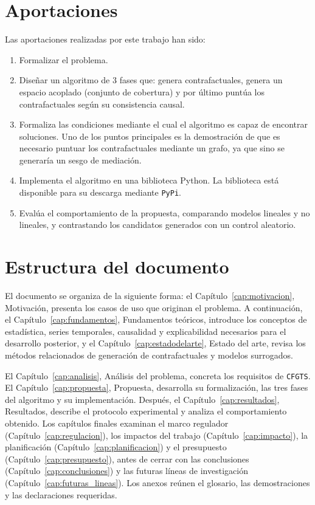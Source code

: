 \documentclass[12pt]{report} %
\begin{document}
\section{Aportaciones}

Las aportaciones realizadas por este trabajo han sido:
\begin{enumerate}
    \item Formalizar el problema.
    \item Diseñar un algoritmo de 3 fases que: genera contrafactuales, genera un espacio acoplado (conjunto de cobertura) y por último puntúa los contrafactuales según su consistencia causal.
    \item Formaliza las condiciones mediante el cual el algoritmo es capaz de encontrar soluciones. Uno de los puntos principales es la demostración de que es necesario puntuar los contrafactuales mediante un grafo, ya que sino se generaría un sesgo de mediación.
    \item Implementa el algoritmo en una biblioteca Python. La biblioteca está disponible para su descarga mediante \texttt{PyPi}.
    \item Evalúa el comportamiento de la propuesta, comparando modelos lineales y no lineales, y contrastando los candidatos generados con un control aleatorio.
\end{enumerate}


\section{Estructura del documento}

El documento se organiza de la siguiente forma: el Capítulo~\ref{cap:motivacion}, Motivación, presenta los casos de uso que originan el problema. A continuación, el Capítulo~\ref{cap:fundamentos}, Fundamentos teóricos, introduce los conceptos de estadística, series temporales, causalidad y explicabilidad necesarios para el desarrollo posterior, y el Capítulo~\ref{cap:estadodelarte}, Estado del arte, revisa los métodos relacionados de generación de contrafactuales y modelos surrogados.

El Capítulo~\ref{cap:analisis}, Análisis del problema, concreta los requisitos de \texttt{CFGTS}. El Capítulo~\ref{cap:propuesta}, Propuesta, desarrolla su formalización, las tres fases del algoritmo y su implementación. Después, el Capítulo~\ref{cap:resultados}, Resultados, describe el protocolo experimental y analiza el comportamiento obtenido. Los capítulos finales examinan el marco regulador (Capítulo~\ref{cap:regulacion}), los impactos del trabajo (Capítulo~\ref{cap:impacto}), la planificación (Capítulo~\ref{cap:planificacion}) y el presupuesto (Capítulo~\ref{cap:presupuesto}), antes de cerrar con las conclusiones (Capítulo~\ref{cap:conclusiones}) y las futuras líneas de investigación (Capítulo~\ref{cap:futuras_lineas}). Los anexos reúnen el glosario, las demostraciones y las declaraciones requeridas.
\end{document}
